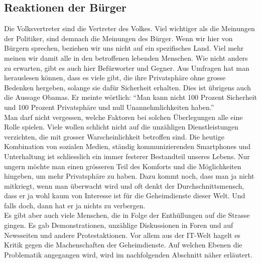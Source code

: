 \subsection{Reaktionen der Bürger}
Die Volksvertreter sind die Vertreter des Volkes. Viel wichtiger als die Meinungen der Politiker, sind demnach die Meinungen des Bürger. Wenn wir hier von Bürgern sprechen, beziehen wir uns nicht auf ein spezifisches Land. Viel mehr meinen wir damit alle in den betroffenen lebenden Menschen. Wie nicht anders zu erwarten, gibt es auch hier Befürworter und Gegner. Aus Umfragen hat man herauslesen können, dass es viele gibt, die ihre Privatsphäre ohne grosse Bedenken hergeben, solange sie dafür Sicherheit erhalten. Dies ist übrigens auch die Aussage Obamas. Er meinte wörtlich: ``Man kann nicht 100 Prozent Sicherheit und 100 Prozent Privatsphäre und null Unannehmlichkeiten haben.'' 
\\
Man darf nicht vergessen, welche Faktoren bei solchen Überlegungen alle eine Rolle spielen. Viele wollen schlicht nicht auf die unzähligen Dienstleistungen verzichten, die mit grosser Warscheinlichkeit betroffen sind. Die heutige Kombination von sozialen Medien, ständig kommunizierenden Smartphones und Unterhaltung ist schliesslich ein immer festerer Bestandteil unseres Lebens. Nur ungern möchte man einen grösseren Teil des Komforts und die Möglichkeiten hingeben, um mehr Privatsphäre zu haben. Dazu kommt noch, dass man ja nicht mitkriegt, wenn man überwacht wird und oft denkt der Durchschnittsmensch, dass er ja wohl kaum von Interesse ist für die Geheimdienste dieser Welt. Und falls doch, dann hat er ja nichts zu verbergen.
\\
Es gibt aber auch viele Menschen, die in Folge der Enthüllungen auf die Strasse gingen. Es gab Demonstrationen, unzählige Diskussionen in Foren und auf Newsseiten und andere Protestaktionen. Vor allem aus der IT-Welt hagelt es Kritik gegen die Machenschaften der Geheimdienste. Auf welchen Ebenen die Problematik angegangen wird, wird im nachfolgenden Abschnitt näher erläutert. 
